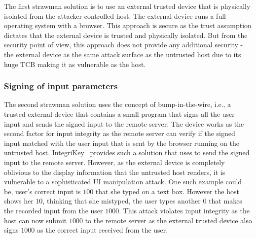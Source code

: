 The first strawman solution is to use an external trusted device that is physically isolated from the attacker-controlled host. The external device runs a full operating system with a browser. This approach is secure as the trust assumption dictates that the external device is trusted and physically isolated. But from the security point of view, this approach does not provide any additional security - the external device as the same attack surface as the untrusted host due to its huge TCB making it as vulnerable as the host.

\subsubsection{\bfseries Signing of input parameters}
\label{sec:approach:strawman:2}

The second strawman solution uses the concept of bump-in-the-wire, i.e., a trusted external device that contains a small program that signs all the user input and sends the signed input to the remote server. The device works as the second factor for input integrity as the remote server can verify if the signed input matched with the user input that is sent by the browser running on the untrusted host. IntegriKey~\cite{IntegriKey} provides such a solution that uses \webusb to send the signed input to the remote server. However, as the external device is completely oblivious to the display information that the untrusted host renders, it is vulnerable to a sophisticated UI manipulation attack. One such example could be, user's correct input is $100$ that she typed on a text box. However the host shows her $10$, thinking that she mistyped, the user types another $0$ that makes the recorded input from the user $1000$. This attack violates input integrity as the host can now submit $1000$ to the remote server as the external trusted device also signs $1000$ as the correct input received from the user.  


% 

